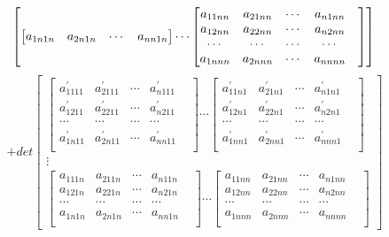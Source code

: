 \documentclass[twoside,a4paper,CCT]{cctart}   %
\begin{document}
\begin{list}{}
$$\begin{bmatrix}
\begin{bmatrix}
   a_{1n1n}& a_{2n1n}&\cdots&a_{nn1n}\\
   \end{bmatrix}
\cdots
\begin{bmatrix}
  a_{11nn}& a_{21nn}&\cdots&a_{n1nn}\\
  a_{12nn}& a_{22nn}&\cdots&a_{n2nn}\\
  \cdots&\cdots&\cdots &\cdots& \\
   a_{1nnn}& a_{2nnn}&\cdots&a_{nnnn}\\
   \end{bmatrix}
    \end{bmatrix}
  \\$$
  $$+det
  \begin{bmatrix}
 \begin{bmatrix}
   a_{1111}^{'}& a_{2111}^{'}&\cdots&a_{n111}^{'}\\
   a_{1211}^{'}& a_{2211}^{'}&\cdots&a_{n211}^{'}\\
  \cdots&\cdots&\cdots &\cdots& \\
a_{1n11}^{'}& a_{2n11}^{'}&\cdots&a_{nn11}^{'}\\
\end{bmatrix}
\cdots
\begin{bmatrix}
  a_{11n1}^{'}& a_{21n1}^{'}&\cdots&a_{n1n1}^{'}\\
  a_{12n1}^{'}& a_{22n1}^{'}&\cdots&a_{n2n1}^{'}\\
  \cdots&\cdots&\cdots &\cdots& \\
 a_{1nn1}^{'}& a_{2nn1}^{'}&\cdots&a_{nnn1}^{'}\\
 \end{bmatrix}\\
\vdots\\
\begin{bmatrix}
  a_{111n}& a_{211n}&\cdots&a_{n11n}\\
  a_{121n}& a_{221n}&\cdots&a_{n21n}\\
  \cdots&\cdots&\cdots &\cdots& \\
   a_{1n1n}& a_{2n1n}&\cdots&a_{nn1n}\\
   \end{bmatrix}
\cdots
\begin{bmatrix}
  a_{11nn}& a_{21nn}&\cdots&a_{n1nn}\\
  a_{12nn}& a_{22nn}&\cdots&a_{n2nn}\\
  \cdots&\cdots&\cdots &\cdots& \\
   a_{1nnn}& a_{2nnn}&\cdots&a_{nnnn}\\
   \end{bmatrix}

\end{bmatrix}$$
\end{list}
\end{document}
